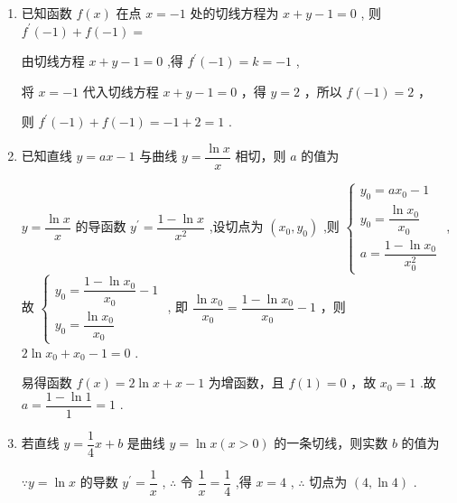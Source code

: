\begin{enumerate}
\begin{enumerate}
\begin{jieda}
            所以 ${f}^{\prime }\left( 2\right)  = \left( {2 - a}\right)  \times  \left( {2 - 3}\right)  \times  \left( {2 - 4}\right)  = 6$ ,解得 $a =  - 1$ ,所以 $a + b =  - 1 + \left( {-{12}}\right)  =  - {13}$ .
        \end{jieda}
        
        \item 已知函数 $f\left( x\right)$ 在点 $x =  - 1$ 处的切线方程为 $x + y - 1 = 0$ , 则 ${f}^{\prime }\left( {-1}\right)  + f\left( {-1}\right)  =$ 
        \begin{jieda}
            由切线方程 $x + y - 1 = 0$ ,得 ${f}^{\prime }\left( {-1}\right)  = k =  - 1$ ,
            
            将 $x =  - 1$ 代入切线方程 $x + y - 1 = 0$ ，得 $y = 2$ ，所以 $f\left( {-1}\right)  = 2$ ，
            
            则 ${f}^{\prime }\left( {-1}\right)  + f\left( {-1}\right)  =  - 1 + 2 = 1$ .
        \end{jieda}
        
        \item 已知直线 $y = {ax} - 1$ 与曲线 $y = \dfrac{\ln x}{x}$ 相切，则 $a$ 的值为
        \begin{jieda}
            $y = \dfrac{\ln x}{x}$ 的导函数 ${y}^{\prime } = \dfrac{1 - \ln x}{{x}^{2}}$ ,设切点为 $\left( {{x}_{0},{y}_{0}}\right)$ ,则 $\left\{  \begin{matrix} {y}_{0} = a{x}_{0} - 1 \\  {y}_{0} = \dfrac{\ln {x}_{0}}{{x}_{0}} \\  a = \dfrac{1 - \ln {x}_{0}}{{x}_{0}^{2}} \end{matrix}\right.$ ,故 $\left\{  \begin{matrix} {y}_{0} = \dfrac{1 - \ln {x}_{0}}{{x}_{0}} - 1 \\  {y}_{0} = \dfrac{\ln {x}_{0}}{{x}_{0}} \end{matrix}\right.$ , 即 $\dfrac{\ln {x}_{0}}{{x}_{0}} = \dfrac{1 - \ln {x}_{0}}{{x}_{0}} - 1$ ，则 $2\ln {x}_{0} + {x}_{0} - 1 = 0$ .

            易得函数 $f\left( x\right)  = 2\ln x + x - 1$ 为增函数，且 $f\left( 1\right)  = 0$ ，故 ${x}_{0} = 1$ .故 $a = \dfrac{1 - \ln 1}{1} = 1$ .
        \end{jieda}
        
        \item 若直线 $y = \dfrac{1}{4}x + b$ 是曲线 $y = \ln x\left( {x > 0}\right)$ 的一条切线，则实数 $b$ 的值为
        \begin{jieda}
            $\because y = \ln x$ 的导数 ${y}^{\prime } = \dfrac{1}{x}$ , $\therefore$ 令 $\dfrac{1}{x} = \dfrac{1}{4}$ ,得 $x = 4$ , $\therefore$ 切点为 $\left( {4,\ln 4}\right)$ .
            

\end{jieda}
\end{enumerate}
\end{enumerate}

